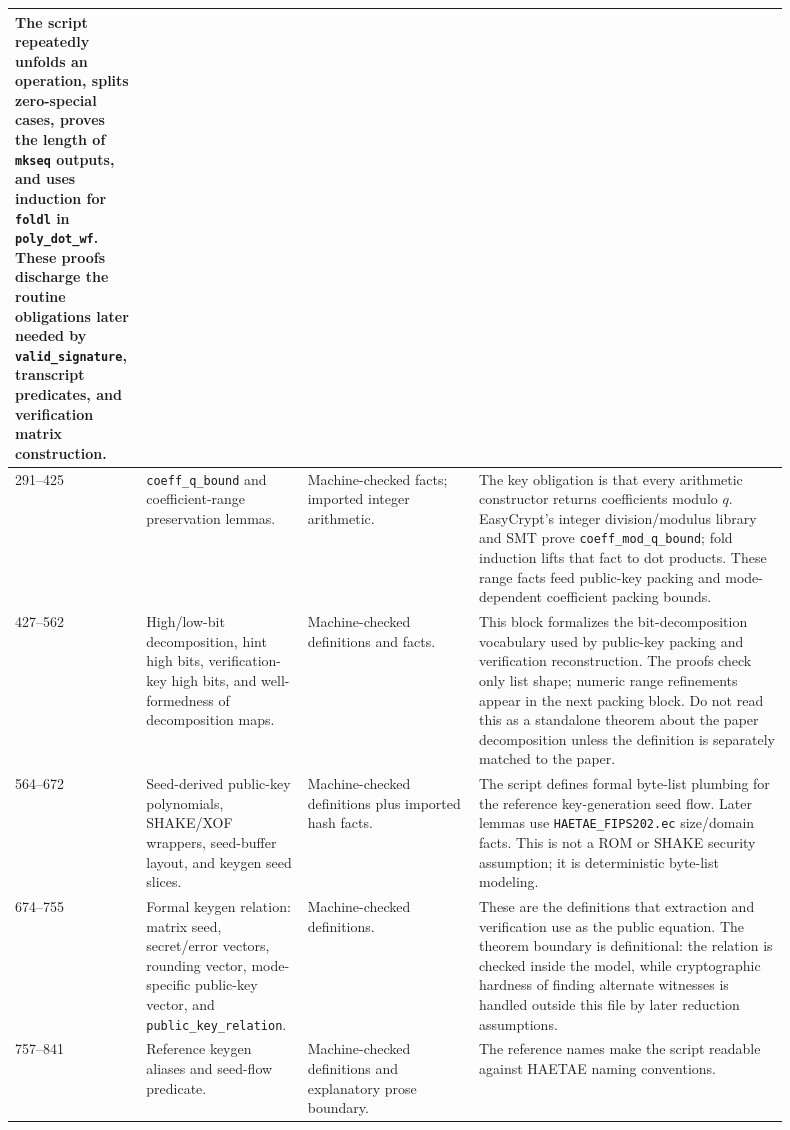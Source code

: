 \documentclass[11pt]{report}
\DeclareRobustCommand{\file}[1]{\ifmmode\text{\nolinkurl{#1}}\else\nolinkurl{#1}\fi}
\DeclareRobustCommand{\ec}[1]{\ifmmode\text{\nolinkurl{#1}}\else\nolinkurl{#1}\fi}
\theoremstyle{definition}
\theoremstyle{plain}
\begin{document}
\begin{longtable}{p{0.13\linewidth}p{0.18\linewidth}p{0.21\linewidth}p{0.38\linewidth}}
The script repeatedly unfolds an operation, splits zero-special cases, proves
the length of \ec{mkseq} outputs, and uses induction for \ec{foldl} in
\ec{poly\_dot\_wf}.  These proofs discharge the routine obligations later
needed by \ec{valid\_signature}, transcript predicates, and verification
matrix construction. \\
\midrule
291--425 &
\ec{coeff\_q\_bound} and coefficient-range preservation lemmas. &
Machine-checked facts; imported integer arithmetic. &
The key obligation is that every arithmetic constructor returns coefficients
modulo \(q\).  EasyCrypt's integer division/modulus library and SMT prove
\ec{coeff\_mod\_q\_bound}; fold induction lifts that fact to dot products.
These range facts feed public-key packing and mode-dependent coefficient
packing bounds. \\
\midrule
427--562 &
High/low-bit decomposition, hint high bits, verification-key high bits, and
well-formedness of decomposition maps. &
Machine-checked definitions and facts. &
This block formalizes the bit-decomposition vocabulary used by public-key
packing and verification reconstruction.  The proofs check only list shape;
numeric range refinements appear in the next packing block.  Do not read this
as a standalone theorem about the paper decomposition unless the definition is
separately matched to the paper. \\
\midrule
564--672 &
Seed-derived public-key polynomials, SHAKE/XOF wrappers, seed-buffer layout,
and keygen seed slices. &
Machine-checked definitions plus imported hash facts. &
The script defines formal byte-list plumbing for the reference key-generation
seed flow.  Later lemmas use \file{HAETAE\_FIPS202.ec} size/domain facts.
This is not a ROM or SHAKE security assumption; it is deterministic byte-list
modeling. \\
\midrule
674--755 &
Formal keygen relation: matrix seed, secret/error vectors, rounding vector,
mode-specific public-key vector, and \ec{public\_key\_relation}. &
Machine-checked definitions. &
These are the definitions that extraction and verification use as the public
equation.  The theorem boundary is definitional: the relation is checked
inside the model, while cryptographic hardness of finding alternate witnesses
is handled outside this file by later reduction assumptions. \\
\midrule
757--841 &
Reference keygen aliases and seed-flow predicate. &
Machine-checked definitions and explanatory prose boundary. &
The reference names make the script readable against HAETAE naming conventions.

\end{longtable}
\end{document}
